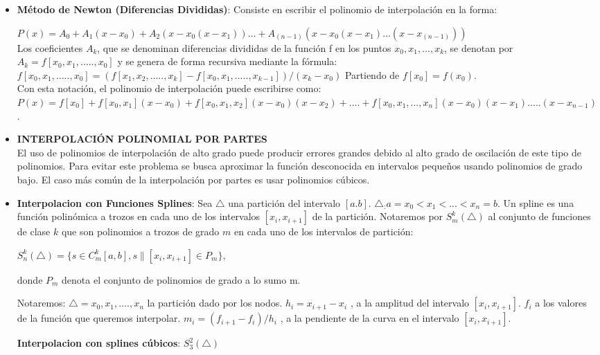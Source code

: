\documentclass[10pt,a4paper]{article}
\begin{document}
\begin{multicols}{2}
\begin{itemize}
	\item \textbf{Método de Newton (Diferencias Divididas)}:
	Consiste en escribir el polinomio de interpolación en la forma:
	
	$P(x)=A_0+A_1 (x-x_0 )+A_2 (x-x_0 (x-x_1 ))…+A_(n-1) (x-x_0 (x-x_1 )…(x-x_(n-1) )) $\\
	Los coeficientes  $A_k$, que se denominan diferencias divididas de la función f en los puntos $x_0,x_1,…, x_k$, se denotan por $A_k=f [x_0,x_1,…..,x_0]$ y se genera de forma recursiva mediante la fórmula: \\
	$f [x_0,x_1,…..,x_0 ]=(f [x_1,x_2,…..,x_k ]-f [x_0,x_1,…..,x_{k-1}]  )/(x_k-x_0 )$
	Partiendo de $f [x_0]=f (x_0)$.\\
	Con esta notación, el polinomio de interpolación puede escribirse como:\\
	$P(x)= f [x_0 ]+f [x_0,x_1]( x-x_0)+ f [x_0,x_1,x_2]( x-x_0) ( x-x_2)+….+ f [x_0,x_1,…,x_n]( x-x_0) ( x-x_1)….. ( x-x_{n-1})$.
	\item \textbf{INTERPOLACIÓN POLINOMIAL POR PARTES}\\
	El uso de polinomios de interpolación de alto grado puede producir errores grandes debido al alto grado de oscilación de este tipo de polinomios. Para evitar este problema se busca aproximar    la  función  desconocida  en  intervalos  pequeños  usando  polinomios  de  grado bajo. El caso más común de la interpolación por partes es usar polinomios cúbicos. 
	\item \textbf{Interpolacion con Funciones Splines}:
	Sea $\triangle$ una partición del intervalo $[a.b]$.
	$\triangle _:  a=x_0<x_1<...<x_n=b$.
	Un spline es una función polinómica a trozos en cada uno de los intervalos $[x_i,x_{i+1}]$ de la partición.
	Notaremos por $S_m^k (\triangle)$ al conjunto de funciones de clase $k$ que son polinomios a trozos de grado $m$ en cada uno de los intervalos de partición:
	
	$S_n^k (\triangle)=\{ s\in C_m^k  [a,b] , s \|[x_i,x_{i+1} ]\in P_m\}$,
	
	donde $P_m$ denota el conjunto de polinomios de grado a lo sumo m.
	
	Notaremos:
	$\triangle={x_0,x_1,….,x_n  }$ la partición dado por los nodos.
	$h_i=x_{i+1}-x_i$ , a la amplitud del intervalo $[x_i,x_{i+1}]$.
	$f_i$ a los valores de la función que queremos interpolar.
	$m_i=(f_{i+1}-f_i)/h_i$ , a la pendiente de la curva en el intervalo $[x_i,x_{i+1}]$.
	
	\textbf{Interpolacion con splines cúbicos}: $S_3^2 (\triangle)$
	

\end{itemize}
\end{multicols}
\end{document}
